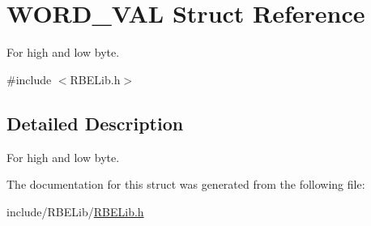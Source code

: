 \hypertarget{struct_w_o_r_d___v_a_l}{\section{W\+O\+R\+D\+\_\+\+V\+A\+L Struct Reference}
\label{struct_w_o_r_d___v_a_l}
}


For high and low byte.  




{\ttfamily \#include $<$R\+B\+E\+Lib.\+h$>$}



\subsection{Detailed Description}
For high and low byte. 

The documentation for this struct was generated from the following file\+:\begin{DoxyCompactItemize}
\item 
include/\+R\+B\+E\+Lib/\hyperlink{_r_b_e_lib_8h}{R\+B\+E\+Lib.\+h}\end{DoxyCompactItemize}

